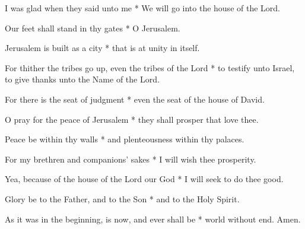 I was glad when they said unto me * We will go into the house of the Lord.

Our feet shall stand in thy gates * O Jerusalem.

Jerusalem is built as a city * that is at unity in itself.

For thither the tribes go up, even the tribes of the Lord * to testify unto Israel, to give thanks unto the Name of the Lord.

For there is the seat of judgment * even the seat of the house of David.

O pray for the peace of Jerusalem * they shall prosper that love thee.

Peace be within thy walls * and plenteousness within thy palaces.

For my brethren and companions' sakes * I will wish thee prosperity.

Yea, because of the house of the Lord our God * I will seek to do thee good.

Glory be to the Father, and to the Son * and to the Holy Spirit.

As it was in the beginning, is now, and ever shall be * world without end. Amen.